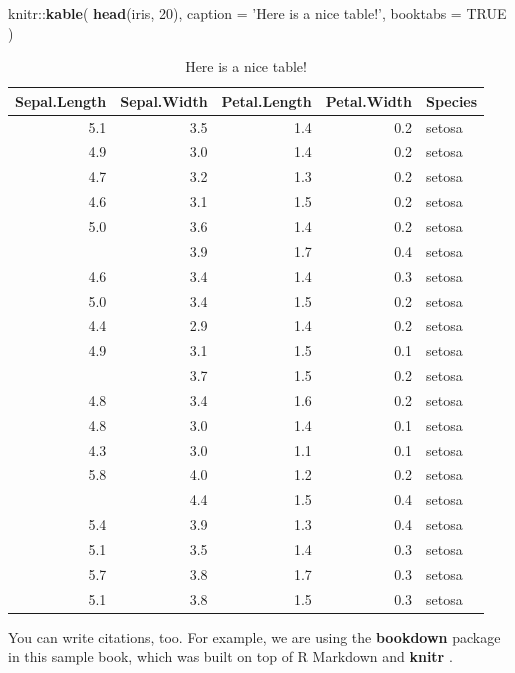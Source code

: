 \documentclass[]{tufte-book}
\newenvironment{Shaded}{}{}
\newcommand{\DataTypeTok}[1]{\textcolor[rgb]{0.56,0.13,0.00}{#1}}
\newcommand{\DecValTok}[1]{\textcolor[rgb]{0.25,0.63,0.44}{#1}}
\newcommand{\KeywordTok}[1]{\textcolor[rgb]{0.00,0.44,0.13}{\textbf{#1}}}
\newcommand{\NormalTok}[1]{#1}
\newcommand{\OperatorTok}[1]{\textcolor[rgb]{0.40,0.40,0.40}{#1}}
\newcommand{\OtherTok}[1]{\textcolor[rgb]{0.00,0.44,0.13}{#1}}
\newcommand{\StringTok}[1]{\textcolor[rgb]{0.25,0.44,0.63}{#1}}
\begin{document}
\begin{Shaded}
\begin{Highlighting}[]
\NormalTok{knitr}\OperatorTok{::}\KeywordTok{kable}\NormalTok{(}
  \KeywordTok{head}\NormalTok{(iris, }\DecValTok{20}\NormalTok{), }\DataTypeTok{caption =} \StringTok{'Here is a nice table!'}\NormalTok{,}
  \DataTypeTok{booktabs =} \OtherTok{TRUE}
\NormalTok{)}
\end{Highlighting}
\end{Shaded}

\begin{table}[t]

\caption{\label{tab:nice-tab}Here is a nice table!}
\centering
\begin{tabular}{rrrrl}
\toprule
Sepal.Length & Sepal.Width & Petal.Length & Petal.Width & Species\\
\midrule
5.1 & 3.5 & 1.4 & 0.2 & setosa\\
4.9 & 3.0 & 1.4 & 0.2 & setosa\\
4.7 & 3.2 & 1.3 & 0.2 & setosa\\
4.6 & 3.1 & 1.5 & 0.2 & setosa\\
5.0 & 3.6 & 1.4 & 0.2 & setosa\\
\addlinespace
5.4 & 3.9 & 1.7 & 0.4 & setosa\\
4.6 & 3.4 & 1.4 & 0.3 & setosa\\
5.0 & 3.4 & 1.5 & 0.2 & setosa\\
4.4 & 2.9 & 1.4 & 0.2 & setosa\\
4.9 & 3.1 & 1.5 & 0.1 & setosa\\
\addlinespace
5.4 & 3.7 & 1.5 & 0.2 & setosa\\
4.8 & 3.4 & 1.6 & 0.2 & setosa\\
4.8 & 3.0 & 1.4 & 0.1 & setosa\\
4.3 & 3.0 & 1.1 & 0.1 & setosa\\
5.8 & 4.0 & 1.2 & 0.2 & setosa\\
\addlinespace
5.7 & 4.4 & 1.5 & 0.4 & setosa\\
5.4 & 3.9 & 1.3 & 0.4 & setosa\\
5.1 & 3.5 & 1.4 & 0.3 & setosa\\
5.7 & 3.8 & 1.7 & 0.3 & setosa\\
5.1 & 3.8 & 1.5 & 0.3 & setosa\\
\bottomrule
\end{tabular}
\end{table}

You can write citations, too. For example, we are using the \textbf{bookdown} package \citep{R-bookdown} in this sample book, which was built on top of R Markdown and \textbf{knitr} \citep{xie2015}.
\end{document}
